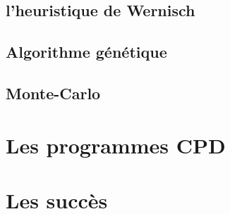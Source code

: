 \subsection{l'heuristique de Wernisch}
\subsection{Algorithme  génétique}
\subsection{Monte-Carlo}




\section{Les programmes CPD}
\section{Les succès}

